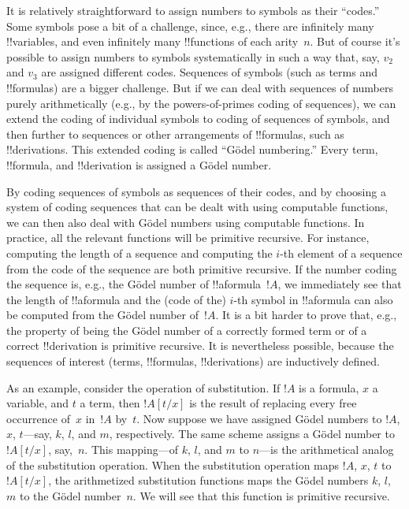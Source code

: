 \documentclass[10pt,a4paper]{article}
\theoremstyle{plain}
\theoremstyle{definition}
\theoremstyle{remark}
\providecommand{\Subst}[3]{#1[#2/#3]}
\providecommand{\Obj}{}
\begin{document}
It is relatively straightforward to assign numbers to symbols as their
``codes.''  Some symbols pose a bit of a challenge, since, e.g., there
are infinitely many !!{variable}s, and even infinitely many
!!{function}s of each arity~$n$. But of course it's possible to assign
numbers to symbols systematically in such a way that, say, $\Obj v_2$
and $\Obj v_3$ are assigned different codes. Sequences of symbols
(such as terms and !!{formula}s) are a bigger challenge. But if we can
deal with sequences of numbers purely arithmetically (e.g., by the
powers-of-primes coding of sequences), we can extend the coding of
individual symbols to coding of sequences of symbols, and then further
to sequences or other arrangements of !!{formula}s, such as
!!{derivation}s. This extended coding is called ``G\"odel numbering.''
Every term, !!{formula}, and !!{derivation} is assigned a G\"odel
number.

By coding sequences of symbols as sequences of their codes, and by
choosing a system of coding sequences that can be dealt with using
computable functions, we can then also deal with G\"odel numbers using
computable functions.  In practice, all the relevant functions will be
primitive recursive.  For instance, computing the length of a sequence
and computing the $i$-th element of a sequence from the code of the
sequence are both primitive recursive. If the number coding the
sequence is, e.g., the G\"odel number of !!a{formula}~$!A$, we
immediately see that the length of !!a{formula} and the (code of the)
$i$-th symbol in !!a{formula} can also be computed from the G\"odel
number of~$!A$. It is a bit harder to prove that, e.g., the property
of being the G\"odel number of a correctly formed term or of a correct
!!{derivation} is primitive recursive.  It is nevertheless possible,
because the sequences of interest (terms, !!{formula}s,
!!{derivation}s) are inductively defined.

As an example, consider the operation of substitution. If $!A$ is a
formula, $x$ a variable, and $t$ a term, then $\Subst{!A}{t}{x}$ is
the result of replacing every free occurrence of~$x$ in~$!A$ by~$t$.
Now suppose we have assigned G\"odel numbers to $!A$, $x$, $t$---say,
$k$, $l$, and $m$, respectively.  The same scheme assigns a G\"odel
number to $\Subst{!A}{t}{x}$, say,~$n$.  This mapping---of $k$, $l$,
and $m$ to $n$---is the arithmetical analog of the substitution
operation. When the substitution operation maps $!A$, $x$, $t$ to
$\Subst{!A}{t}{x}$, the arithmetized substitution functions maps the
G\"odel numbers $k$, $l$, $m$ to the G\"odel number~$n$.  We will see
that this function is primitive recursive.
\end{document}
